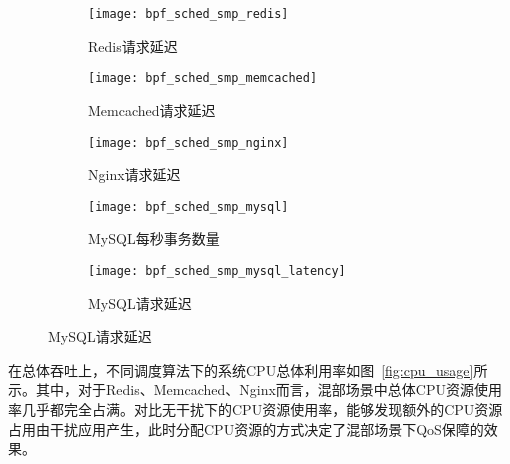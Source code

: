 \begin{figure}[H]
    \centering
    \begin{subfigure}[b]{0.32\textwidth}
        \texttt{[image: bpf\_sched\_smp\_redis]}
        \caption{\quad Redis请求延迟}
        \label{fig:bpf_sched_smp_memcached}
    \end{subfigure}
    \begin{subfigure}[b]{0.32\textwidth}
        \texttt{[image: bpf\_sched\_smp\_memcached]}
        \caption{\quad Memcached请求延迟}
        \label{fig:bpf_sched_smp_memcached}
    \end{subfigure}
    \begin{subfigure}[b]{0.32\textwidth}
        \texttt{[image: bpf\_sched\_smp\_nginx]}
        \caption{\quad Nginx请求延迟}
        \label{fig:bpf_sched_smp_memcached}
    \end{subfigure}
    \begin{subfigure}[b]{0.32\textwidth}
        \texttt{[image: bpf\_sched\_smp\_mysql]}
        \caption{\quad MySQL每秒事务数量}
        \label{fig:bpf_sched_smp_mysql}
    \end{subfigure}
    \begin{subfigure}[b]{0.32\textwidth}
        \texttt{[image: bpf\_sched\_smp\_mysql\_latency]}
        \caption{\quad MySQL请求延迟} 
        \label{fig:bpf_sched_smp_mysql_latency}
    \end{subfigure}

\label{fig:lc_bpf_sched}
\end{figure}

在总体吞吐上，不同调度算法下的系统CPU总体利用率如图~\ref{fig:cpu_usage}所示。其中，对于Redis、Memcached、Nginx而言，混部场景中总体CPU资源使用率几乎都完全占满。对比无干扰下的CPU资源使用率，能够发现额外的CPU资源占用由干扰应用产生，此时分配CPU资源的方式决定了混部场景下QoS保障的效果。

